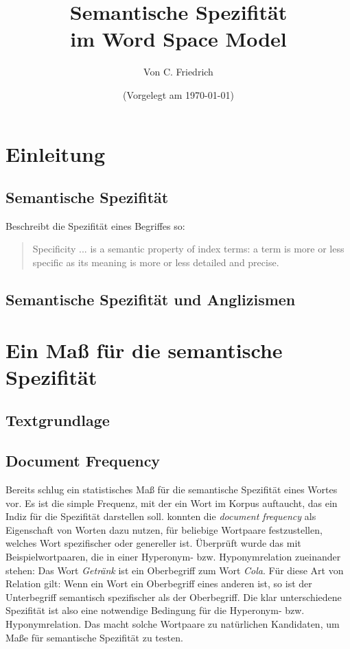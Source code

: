 \documentclass[11pt,numbers=noenddot]{scrartcl}
\title{Semantische Spezifität \\im Word Space Model}
\author{Von C. Friedrich}
\date{(Vorgelegt am \today)}
\newtheorem*{document frequency}{Definition}
\begin{document}
\maketitle







\section{Einleitung}
\subsection*{Semantische Spezifität}

\citet[11]{sparckjones1972} Beschreibt die Spezifität eines Begriffes so:
\begin{quote}
  Specificity ... is a semantic property of index terms: a term is more or less specific as its meaning is more or less detailed and precise.
\end{quote}

\subsection*{Semantische Spezifität und Anglizismen}

\section{Ein Maß für die semantische Spezifität}

\subsection{Textgrundlage}

\subsection{Document Frequency}
Bereits \citet{sparckjones1972} schlug ein statistisches Maß für die semantische Spezifität eines Wortes vor. Es ist die simple Frequenz, mit der ein Wort im Korpus auftaucht, das ein Indiz für die Spezifität darstellen soll. \citet{Caraballo99determiningthe} konnten die \emph{document frequency} als Eigenschaft von Worten dazu nutzen, für beliebige Wortpaare festzustellen, welches Wort  spezifischer oder genereller ist. Überprüft wurde das mit Beispielwortpaaren, die in einer Hyperonym- bzw. Hyponymrelation zueinander stehen: Das Wort \emph{Getränk} ist ein Oberbegriff zum Wort \emph{Cola}. Für diese Art von Relation gilt: Wenn ein Wort ein Oberbegriff eines anderen ist, so ist der Unterbegriff semantisch spezifischer als der Oberbegriff. Die klar unterschiedene Spezifität ist also eine notwendige Bedingung für die Hyperonym- bzw. Hyponymrelation. Das macht solche Wortpaare zu natürlichen Kandidaten, um Maße für semantische Spezifität zu testen.
\end{document}
